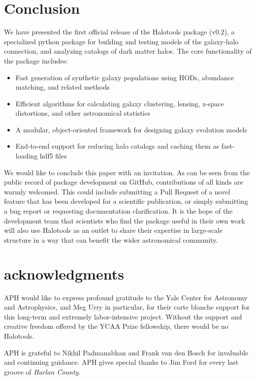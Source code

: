 \documentclass[twocolumn, tighten]{aastex6}
\newcommand{\bit}{\begin{itemize}}
\newcommand{\eit}{\end{itemize}}
\begin{document}
\section{Conclusion}
\label{section:conclusion}

We have presented the first official release of the Halotools package (v0.2), a specialized python package for building and testing models of the galaxy-halo connection, and analyzing catalogs of dark matter halos. The core functionality of the package includes:

\bit
\item Fast generation of synthetic galaxy populations using HODs, abundance matching, and related methods
\item Efficient algorithms for calculating galaxy clustering, lensing, z-space distortions, and other astronomical statistics
\item A modular, object-oriented framework for designing galaxy evolution models
\item End-to-end support for reducing halo catalogs and caching them as fast-loading hdf5 files
\eit

We would like to conclude this paper with an invitation. As can be seen from the public record of package development on GitHub, contributions of all kinds are warmly welcomed. This could include submitting a Pull Request of a novel feature that has been developed for a scientific publication, or simply submitting a bug report or requesting documentation clarification. It is the hope of the development team that scientists who find the package useful in their own work will also use Halotools as an outlet to share their expertise in large-scale structure in a way that can benefit the wider astronomical community. 


\section{acknowledgments}

APH would like to express profound gratitude to the Yale Center for Astronomy and Astrophysics, and Meg Urry in particular, for their carte blanche support for this long-term and extremely labor-intensive project. Without the support and creative freedom offered by the YCAA Prize fellowship, there would be no Halotools. 

APH is grateful to Nikhil Padmanabhan and Frank van den Bosch for invaluable and continuing guidance. APH gives special thanks to Jim Ford for every last groove of {\em Harlan County}. 
\end{document}
